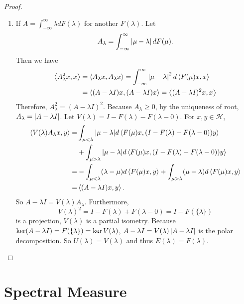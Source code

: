 \documentclass[a4paper,12pt]{article}
\begin{document}
\begin{proof}
\begin{enumerate}[label=(\arabic{*})]
        \item If $A = \int_{-\infty}^\infty \lambda dF(\lambda)$ for another $F(\lambda)$. Let
        \begin{equation*}
            A_\lambda = \int_{-\infty}^\infty \left\lvert\mu -\lambda\right\lvert dF(\mu).
        \end{equation*}
        Then we have
        \begin{equation*}
            \begin{aligned}
                \left\langle A_\lambda^2 x,x \right\rangle &= \left\langle A_\lambda x, A_\lambda x \right\rangle = \int_{-\infty}^\infty \left\lvert\mu - \lambda\right\lvert^2 d \left\langle F(\mu)x,x \right\rangle \\
                &= \left\langle (A- \lambda I)x, (A - \lambda I)x \right\rangle = \left\langle (A-\lambda I)^2x,x \right\rangle
            \end{aligned}
        \end{equation*}
        Therefore, $A_\lambda^2 = (A - \lambda I)^2$. Because $A_\lambda \geq 0$, by the uniqueness of root, $A_\lambda = \left\lvert A - \lambda I\right\lvert$. Let $V(\lambda) = I -F(\lambda) - F(\lambda - 0)$. For $x,y \in \mathcal{H}$,
        \begin{equation*}
            \begin{aligned}
                \left\langle V(\lambda) A_\lambda x, y \right\rangle= & \int_{\mu<\lambda}|\mu-\lambda| d\left\langle F(\mu) x,(I-F(\lambda)-F(\lambda-0)) y \right\rangle \\
                & +\int_{\mu>\lambda}|\mu-\lambda| d\left\langle F(\mu) x,(I-F(\lambda)-F(\lambda-0)) y \right\rangle \\
                = & -\int_{\mu<\lambda}(\lambda-\mu) d\left\langle F(\mu) x, y \right\rangle+\int_{\mu>\lambda}(\mu-\lambda) d\left\langle F(\mu) x, y \right\rangle \\
                = & \left\langle (A-\lambda I) x, y \right\rangle.
            \end{aligned}
        \end{equation*}
        So $A - \lambda I = V(\lambda)A_\lambda$. Furthermore,
        \begin{equation*}
            V(\lambda)^2=I-F(\lambda)+F(\lambda-0)=I-F(\{\lambda\})
        \end{equation*}
        is a projection, $V(\lambda)$ is a partial isometry. Because $\ker (A - \lambda I) = F(\left\{\lambda\right\}) = \ker V(\lambda)$, $A - \lambda I = V(\lambda)\left\lvert A - \lambda I\right\lvert$ is the polar decomposition. So $U(\lambda) = V(\lambda)$ and thus $E(\lambda) = F(\lambda)$. \qedhere
    \end{enumerate}
\end{proof}

\section{Spectral Measure}
\end{document}
